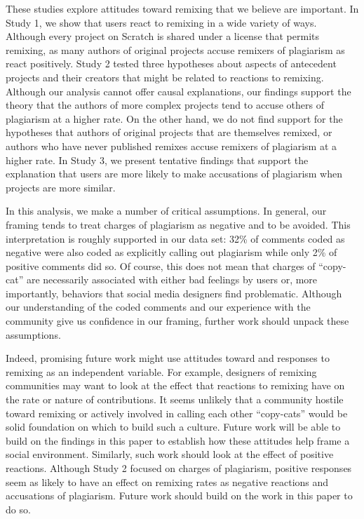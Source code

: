 These studies explore attitudes toward remixing that we believe are important.  In Study 1, we show that
users react to remixing in a wide variety of ways. Although every
project on Scratch is shared under a license that permits remixing, as
many authors of original projects accuse remixers of plagiarism as react
positively. Study 2 tested three hypotheses about aspects of antecedent
projects and their creators that might be related to reactions to
remixing. Although our analysis cannot offer causal explanations, our
findings support the theory that the authors of more complex projects
tend to accuse others of plagiarism at a higher rate.  On the other
hand, we do not find support for the hypotheses that authors of original
projects that are themselves remixed, or authors who have never
published remixes accuse remixers of plagiarism at a higher rate. In
Study 3, we present tentative findings that support the explanation that
users are more likely to make accusations of plagiarism when projects
are more similar.

In this analysis, we make a number of critical assumptions. In general,
our framing tends to treat charges of plagiarism as negative and to be
avoided. This interpretation is roughly supported in our data set: 32\%
of comments coded as negative were also coded as explicitly calling out
plagiarism while only 2\% of positive comments did so. Of course, this
does not mean that charges of ``copy-cat'' are necessarily associated
with either bad feelings by users or, more importantly, behaviors that
social media designers find problematic. Although our understanding of
the coded comments and our experience with the community give us
confidence in our framing, further work should unpack these assumptions.

Indeed, promising future work might use attitudes toward and responses
to remixing as an independent variable. For example, designers of remixing
communities may want to look at the effect that reactions to remixing
have on the rate or nature of contributions. It seems unlikely that a
community hostile toward remixing or actively involved in calling each
other ``copy-cats'' would be solid foundation on which to build such a
culture. Future work will be able to build on the findings in this paper
to establish how these attitudes help frame a social environment.
Similarly, such work should look at the effect of positive reactions.
Although Study 2 focused on charges of plagiarism, positive responses
seem as likely to have an effect on remixing rates as negative reactions
and accusations of plagiarism. Future work should build on the work in
this paper to do so.





